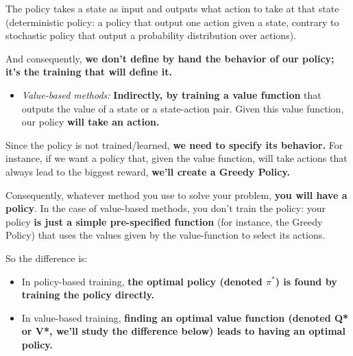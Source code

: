 \documentclass[11pt,a4paper]{article}
\begin{document}
The policy takes a state as input and outputs what action to take at that state (deterministic policy: a policy that output one action given a state, contrary to stochastic policy that output a probability distribution over actions).

And consequently, \textbf{we don't define by hand the behavior of our policy; it's the training that will define it.}

\begin{itemize}
\tightlist
\item
  \emph{Value-based methods:} \textbf{Indirectly, by training a value function} that outputs the value of a state or a state-action pair. Given this value function, our policy \textbf{will take an action.}
\end{itemize}

Since the policy is not trained/learned, \textbf{we need to specify its behavior.} For instance, if we want a policy that, given the value function, will take actions that always lead to the biggest reward, \textbf{we'll create a Greedy Policy.}


Consequently, whatever method you use to solve your problem, \textbf{you will have a policy}. In the case of value-based methods, you don't train the policy: your policy \textbf{is just a simple pre-specified function} (for instance, the Greedy Policy) that uses the values given by the value-function to select its actions.

So the difference is:

\begin{itemize}
\tightlist
\item
  In policy-based training, \textbf{the optimal policy (denoted \(\pi^*\)) is found by training the policy directly.}
\item
  In value-based training, \textbf{finding an optimal value function (denoted Q* or V*, we'll study the difference below) leads to having an optimal policy.}
\end{itemize}

\end{document}
